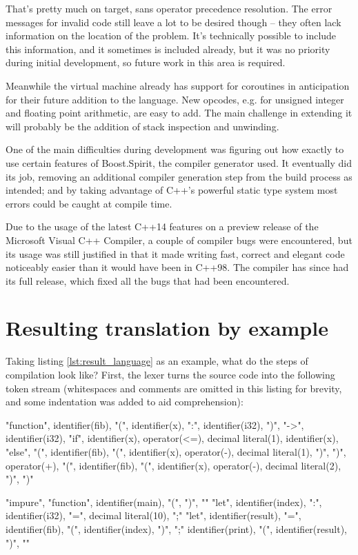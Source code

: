 That's pretty much on target, sans operator precedence resolution. The error messages for invalid code still leave a lot to be desired though -- they often lack information on the location of the problem. It's technically possible to include this information, and it sometimes is included already, but it was no priority during initial development, so future work in this area is required.

Meanwhile the virtual machine already has support for coroutines in anticipation for their future addition to the language. New opcodes, e.g. for unsigned integer and floating point arithmetic, are easy to add. The main challenge in extending it will probably be the addition of stack inspection and unwinding.

One of the main difficulties during development was figuring out how exactly to use certain features of Boost.Spirit, the compiler generator used. It eventually did its job, removing an additional compiler generation step from the build process as intended; and by taking advantage of C++'s powerful static type system most errors could be caught at compile time.

Due to the usage of the latest C++14 features on a preview release of the Microsoft Visual C++ Compiler, a couple of compiler bugs were encountered, but its usage was still justified in that it made writing fast, correct and elegant code noticeably easier than it would have been in C++98. The compiler has since had its full release, which fixed all the bugs that had been encountered.


\section{Resulting translation by example}

Taking listing \ref{lst:result_language} as an example, what do the steps of compilation look like? First, the lexer turns the source code into the following token stream (whitespaces and comments are omitted in this listing for brevity, and some indentation was added to aid comprehension):

\begin{codelisting}[caption="Abridged tokens of listing \ref{lst:result_language}"]
"function", identifier(fib), "(", identifier(x), ":", identifier(i32), ")", "->", identifier(i32),
    "if", identifier(x), operator(<=), decimal literal(1),
        identifier(x),
    "else",
        "(", identifier(fib), "(", identifier(x), operator(-), decimal literal(1), ")", ")", operator(+), "(", identifier(fib), "(", identifier(x), operator(-), decimal literal(2), ")", ")"

"impure", "function", identifier(main), "(", ")",
"{"
    "let", identifier(index), ":", identifier(i32), "=", decimal literal(10), ";"
    "let", identifier(result), "=", identifier(fib), "(", identifier(index), ")", ";"
    identifier(print), "(", identifier(result), ")",
"}"
\end{codelisting}

